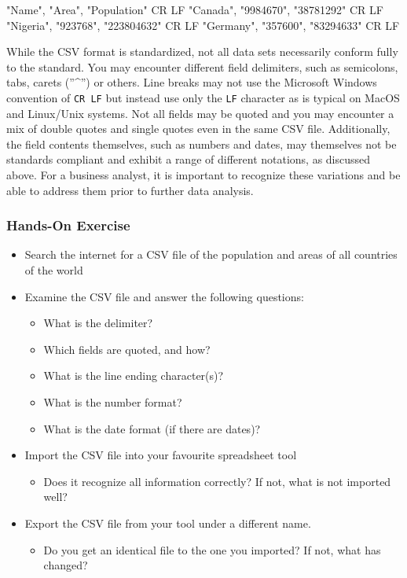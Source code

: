 \begin{textcode}
"Name", "Area", "Population" CR LF
"Canada", "9984670", "38781292" CR LF
"Nigeria", "923768", "223804632" CR LF
"Germany", "357600", "83294633" CR LF
\end{textcode}

While the CSV format is standardized, not all data sets necessarily conform fully to the standard. You may encounter different field delimiters, such as semicolons, tabs, carets (''\^{}'') or others. Line breaks may not use the Microsoft Windows convention of \texttt{CR LF} but instead use only the \texttt{LF} character as is typical on MacOS and Linux/Unix systems. Not all fields may be quoted and you may encounter a mix of double quotes and single quotes even in the same CSV file. Additionally, the field contents themselves, such as numbers and dates, may themselves not be standards compliant and exhibit a range of different notations, as discussed above. For a business analyst, it is important to recognize these variations and be able to address them prior to further data analysis.

\begin{tcolorbox}[colback=code]
\subsubsection*{Hands-On Exercise} 

\begin{itemize}
	\item Search the internet for a CSV file of the population and areas of all countries of the world
	\item Examine the CSV file and answer the following questions:
	\begin{itemize}
		\item What is the delimiter?
		\item Which fields are quoted, and how?
		\item What is the line ending character(s)?
		\item What is the number format?
		\item What is the date format (if there are dates)?
	\end{itemize}
	\item Import the CSV file into your favourite spreadsheet tool
	\begin{itemize}
		\item Does it recognize all information correctly? If not, what is not imported well?
	\end{itemize}
	\item Export the CSV file from your tool under a different name.
	\begin{itemize}
		\item Do you get an identical file to the one you imported? If not, what has changed?
	\end{itemize}
\end{itemize}
\end{tcolorbox}

